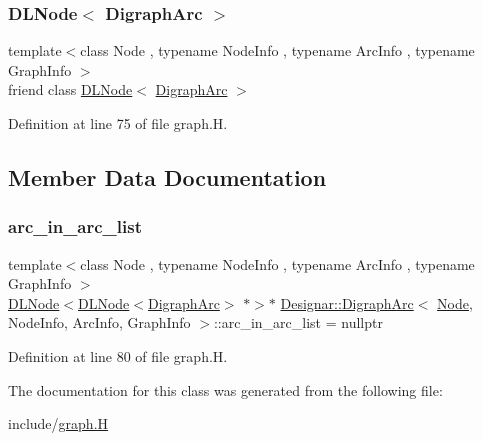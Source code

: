 \subsubsection{\texorpdfstring{D\+L\+Node$<$ Digraph\+Arc $>$}{DLNode< DigraphArc >}}
{\footnotesize\ttfamily template$<$class Node , typename Node\+Info , typename Arc\+Info , typename Graph\+Info $>$ \\
friend class \hyperlink{class_designar_1_1_d_l_node}{D\+L\+Node}$<$ \hyperlink{class_designar_1_1_digraph_arc}{Digraph\+Arc} $>$\hspace{0.3cm}{\ttfamily [friend]}}



Definition at line 75 of file graph.\+H.



\subsection{Member Data Documentation}
\mbox{\label{class_designar_1_1_digraph_arc_a1b269dc44c4b3696cb79e86a97afbdd7}} 
\subsubsection{\texorpdfstring{arc\+\_\+in\+\_\+arc\+\_\+list}{arc\_in\_arc\_list}}
{\footnotesize\ttfamily template$<$class Node , typename Node\+Info , typename Arc\+Info , typename Graph\+Info $>$ \\
\hyperlink{class_designar_1_1_d_l_node}{D\+L\+Node}$<$\hyperlink{class_designar_1_1_d_l_node}{D\+L\+Node}$<$\hyperlink{class_designar_1_1_digraph_arc}{Digraph\+Arc}$>$ $\ast$$>$$\ast$ \hyperlink{class_designar_1_1_digraph_arc}{Designar\+::\+Digraph\+Arc}$<$ \hyperlink{namespace_designar_a5af326c65aa2bd26b26c410f2030d09e}{Node}, Node\+Info, Arc\+Info, Graph\+Info $>$\+::arc\+\_\+in\+\_\+arc\+\_\+list = nullptr\hspace{0.3cm}{\ttfamily [protected]}}



Definition at line 80 of file graph.\+H.



The documentation for this class was generated from the following file\+:\begin{DoxyCompactItemize}
\item 
include/\hyperlink{graph_8_h}{graph.\+H}\end{DoxyCompactItemize}
